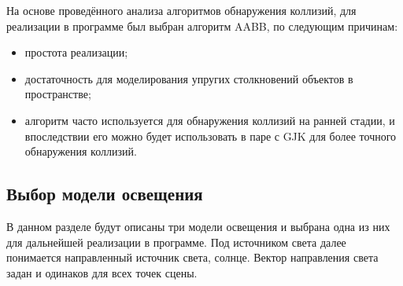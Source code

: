 На основе проведённого анализа алгоритмов обнаружения коллизий, для реализации в программе был выбран алгоритм AABB, по следующим причинам:
\begin{itemize}
    \item простота реализации;
    \item достаточность для моделирования упругих столкновений объектов в пространстве;
    \item алгоритм часто используется для обнаружения коллизий на ранней стадии, и впоследствии его можно будет использовать в паре с GJK для более точного обнаружения коллизий. %
\end{itemize}





\subsection{Выбор модели освещения}

В данном разделе будут описаны три модели освещения и выбрана одна из них для дальнейшей реализации в программе.
Под источником света далее понимается направленный источник света, солнце.
Вектор направления света задан и одинаков для всех точек сцены.

